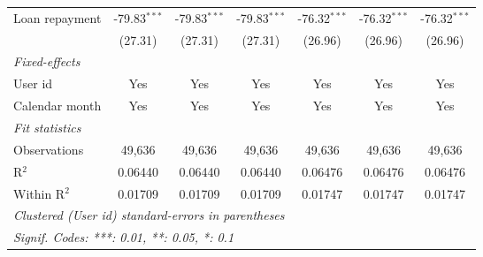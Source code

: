 \begin{table}[htbp]
\begin{footnotesize}
\begin{tabular}{lcccccc}
         Loan repayment                   & -79.83$^{***}$ & -79.83$^{***}$ & -79.83$^{***}$ & -76.32$^{***}$ & -76.32$^{***}$  & -76.32$^{***}$\\
                                          & (27.31)        & (27.31)        & (27.31)        & (26.96)        & (26.96)         & (26.96)\\
         \midrule \emph{Fixed-effects} &   &   &   &   &   &  \\
         User id                          & Yes            & Yes            & Yes            & Yes            & Yes             & Yes\\
         Calendar month                   & Yes            & Yes            & Yes            & Yes            & Yes             & Yes\\
         \midrule \emph{Fit statistics} &   &   &   &   &   &  \\
         Observations                     & 49,636         & 49,636         & 49,636         & 49,636         & 49,636          & 49,636\\
         R$^2$                            & 0.06440        & 0.06440        & 0.06440        & 0.06476        & 0.06476         & 0.06476\\
         Within R$^2$                     & 0.01709        & 0.01709        & 0.01709        & 0.01747        & 0.01747         & 0.01747\\
         \midrule\midrule\multicolumn{7}{l}{\emph{Clustered (User id) standard-errors in parentheses}}\\
         \multicolumn{7}{l}{\emph{Signif. Codes: ***: 0.01, **: 0.05, *: 0.1}}\\
      \end{tabular}
   \end{footnotesize}
\end{table}


